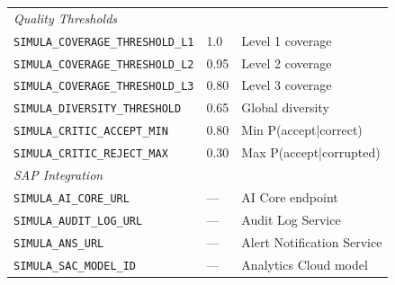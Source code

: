 \begin{table}[H]
\begin{tabularx}{\textwidth}{@{}l l X@{}}
\midrule
\multicolumn{3}{l}{\textit{Quality Thresholds}} \\
\texttt{SIMULA\_COVERAGE\_THRESHOLD\_L1} & 1.0 & Level 1 coverage \\
\texttt{SIMULA\_COVERAGE\_THRESHOLD\_L2} & 0.95 & Level 2 coverage \\
\texttt{SIMULA\_COVERAGE\_THRESHOLD\_L3} & 0.80 & Level 3 coverage \\
\texttt{SIMULA\_DIVERSITY\_THRESHOLD} & 0.65 & Global diversity \\
\texttt{SIMULA\_CRITIC\_ACCEPT\_MIN} & 0.80 & Min P(accept|correct) \\
\texttt{SIMULA\_CRITIC\_REJECT\_MAX} & 0.30 & Max P(accept|corrupted) \\
\midrule
\multicolumn{3}{l}{\textit{SAP Integration}} \\
\texttt{SIMULA\_AI\_CORE\_URL} & --- & AI Core endpoint \\
\texttt{SIMULA\_AUDIT\_LOG\_URL} & --- & Audit Log Service \\
\texttt{SIMULA\_ANS\_URL} & --- & Alert Notification Service \\
\texttt{SIMULA\_SAC\_MODEL\_ID} & --- & Analytics Cloud model \\
\bottomrule
\end{tabularx}
\end{table}